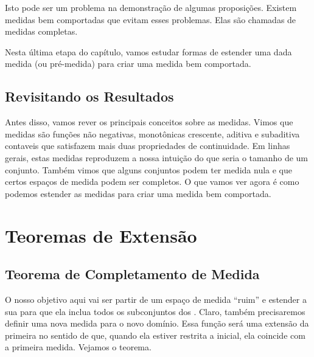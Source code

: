 \almostEverywhere

\subsetsMayNotBeMeasurable

Isto pode ser um problema na demonstração de algumas proposições. Existem medidas bem comportadas que evitam esses problemas. Elas são chamadas de medidas completas.

\completeMeasureSpace

Nesta última etapa do capítulo, vamos estudar formas de estender uma dada medida (ou pré-medida) para criar uma medida bem comportada.

\subsection*{Revisitando os Resultados}
Antes disso, vamos rever os principais conceitos sobre as medidas. Vimos que medidas são funções não negativas, monotônicas crescente, aditiva e subaditiva contaveis que satisfazem mais duas propriedades de continuidade. Em linhas gerais, estas medidas reproduzem a nossa intuição do que seria o tamanho de um conjunto. Também vimos que alguns conjuntos podem ter medida nula e que certos espaços de medida podem ser completos. O que vamos ver agora é como podemos estender as medidas para criar uma medida bem comportada.













\section{Teoremas de Extensão}
\subsection{Teorema de Completamento de Medida}
O nosso objetivo aqui vai ser partir de um espaço de medida ``ruim'' e estender a sua \sigmaAlg para que ela inclua todos os subconjuntos dos . Claro, também precisaremos definir uma nova medida para o novo domínio. Essa função será uma extensão da primeira no sentido de que, quando ela estiver restrita a \sigmaAlg inicial, ela coincide com a primeira medida. Vejamos o teorema.

